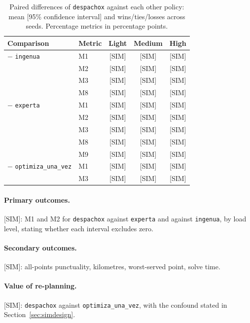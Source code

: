 \documentclass[11pt]{article}
\newcommand{\pend}[1]{\textcolor{red!60!black}{#1}}
\newcommand{\code}[1]{\texttt{\small #1}}
\begin{document}
\begin{table}[ht]
\centering
\small
\caption{Paired differences of \code{despachox} against each other policy: mean [95\% confidence interval] and wins/ties/losses across seeds. Percentage metrics in percentage points.}
\label{tab:diff}
\begin{tabular}{llccc}
\toprule
Comparison & Metric & Light & Medium & High \\
\midrule
$-$ \code{ingenua} & M1 & [SIM] & [SIM] & [SIM] \\
                   & M2 & [SIM] & [SIM] & [SIM] \\
                   & M3 & [SIM] & [SIM] & [SIM] \\
                   & M8 & [SIM] & [SIM] & [SIM] \\
\midrule
$-$ \code{experta} & M1 & [SIM] & [SIM] & [SIM] \\
                   & M2 & [SIM] & [SIM] & [SIM] \\
                   & M3 & [SIM] & [SIM] & [SIM] \\
                   & M8 & [SIM] & [SIM] & [SIM] \\
                   & M9 & [SIM] & [SIM] & [SIM] \\
\midrule
$-$ \code{optimiza\_una\_vez} & M1 & [SIM] & [SIM] & [SIM] \\
                   & M3 & [SIM] & [SIM] & [SIM] \\
\bottomrule
\end{tabular}
\end{table}

\paragraph{Primary outcomes.} \pend{[SIM]: M1 and M2 for \code{despachox} against \code{experta} and against \code{ingenua}, by load level, stating whether each interval excludes zero.}

\paragraph{Secondary outcomes.} \pend{[SIM]: all-points punctuality, kilometres, worst-served point, solve time.}

\paragraph{Value of re-planning.} \pend{[SIM]: \code{despachox} against \code{optimiza\_una\_vez}, with the confound stated in Section~\ref{sec:simdesign}.}
\end{document}
